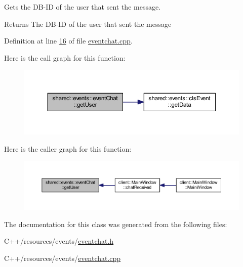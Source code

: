 Gets the D\-B-\/\-I\-D of the user that sent the message. 

\begin{DoxyReturn}{Returns}
The D\-B-\/\-I\-D of the user that sent the message 
\end{DoxyReturn}


Definition at line \hyperlink{eventchat_8cpp_source_l00016}{16} of file \hyperlink{eventchat_8cpp_source}{eventchat.\-cpp}.



Here is the call graph for this function\-:\nopagebreak
\begin{figure}[H]
\begin{center}
\leavevmode
\includegraphics[width=350pt]{d1/d68/classshared_1_1events_1_1event_chat_affa9c414f40d61277b690efd4013f550_cgraph}
\end{center}
\end{figure}




Here is the caller graph for this function\-:
\nopagebreak
\begin{figure}[H]
\begin{center}
\leavevmode
\includegraphics[width=350pt]{d1/d68/classshared_1_1events_1_1event_chat_affa9c414f40d61277b690efd4013f550_icgraph}
\end{center}
\end{figure}




The documentation for this class was generated from the following files\-:\begin{DoxyCompactItemize}
\item 
C++/resources/events/\hyperlink{eventchat_8h}{eventchat.\-h}\item 
C++/resources/events/\hyperlink{eventchat_8cpp}{eventchat.\-cpp}\end{DoxyCompactItemize}
